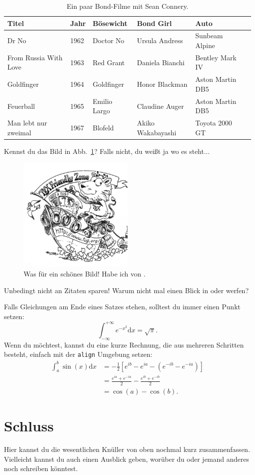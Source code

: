 \documentclass[a4paper, 12pt]{scrartcl}
\begin{document}
\begin{table}[t]
    \centering
    \caption{Ein paar Bond-Filme mit Sean Connery.}
    \label{tab:bond}
    \setlength{}
    \begin{tabularx}{\textwidth}{llllll}
        \toprule
        Titel & Jahr & Bösewicht & Bond Girl & Auto \\
        \midrule
        Dr No & 1962 & Doctor No & Ursula Andress & Sunbeam Alpine \\
        From Russia With Love & 1963 & Red Grant & Daniela Bianchi & Bentley Mark IV \\
        Goldfinger & 1964 & Goldfinger & Honor Blackman & Aston Martin DB5 \\
        Feuerball & 1965 & Emilio Largo & Claudine Auger & Aston Martin DB5 \\
        Man lebt nur zweimal & 1967 & Blofeld & Akiko Wakabayashi & Toyota 2000 GT \\
        \bottomrule
    \end{tabularx}
\end{table}
Kennst du das Bild in Abb.~\ref{fig:tex}? Falls nicht, du weißt ja wo es steht...
\begin{figure}
    \centering
    \includegraphics[width=0.5\textwidth]{assets/tex.jpg}
    \caption{Was für ein schönes Bild! Habe ich von \cite{online}.}
    \label{fig:tex}
\end{figure}
Unbedingt nicht an Zitaten sparen! Warum nicht mal einen Blick in \cite{article} oder \cite{book} werfen?

Falls Gleichungen am Ende eines Satzes stehen, solltest du immer einen Punkt setzen:
\begin{equation}
    \int_{-\infty}^{+\infty}e^{-x^2}\mathrm{d}x=\sqrt{\pi}.
\end{equation}
Wenn du möchtest, kannst du eine kurze Rechnung, die aus mehreren Schritten besteht, einfach mit der \texttt{align} Umgebung setzen:
\begin{align*}
    \int_a^b\sin(x)\mathrm{d}x &= -\frac{1}{2}\left[e^{ib}-e^{ia}-\left(e^{-ib}-e^{-ia}\right)\right] \\
    &= \frac{e^{ia}+e^{-ia}}{2} - \frac{e^{ib}+e^{-ib}}{2} \\
    &= \cos(a) - \cos(b).
\end{align*}

\section{Schluss}
Hier kannst du die wesentlichen Knüller von oben nochmal kurz zusammenfassen. Vielleicht kannst du auch einen Ausblick geben, worüber du oder jemand anderes noch schreiben könntest.

\begingroup
\RaggedRight
\printbibliography
\endgroup
\end{document}
